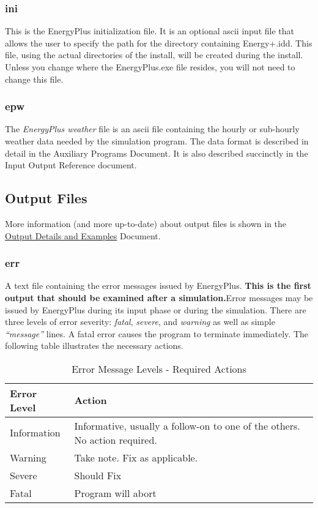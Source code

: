 \subsubsection{ini}\label{ini}

This is the EnergyPlus initialization file. It is an optional ascii input file that allows the user to specify the path for the directory containing Energy+.idd. This file, using the actual directories of the install, will be created during the install. Unless you change where the EnergyPlus.exe file resides, you will not need to change this file.

\subsubsection{epw}\label{epw}

The \emph{EnergyPlus weather} file is an ascii file containing the hourly or sub-hourly weather data needed by the simulation program. The data format is described in detail in the Auxiliary Programs Document. It is also described succinctly in the Input Output Reference document.

\subsection{Output Files}\label{output-files}

More information (and more up-to-date) about output files is shown in the \href{file:///E:/Docs4PDFs/OutputDetailsAndExamples.pdf}{Output Details and Examples} Document.

\subsubsection{err}\label{err}

A text file containing the error messages issued by EnergyPlus. \textbf{This is the first output that should be examined after a simulation.}Error messages may be issued by EnergyPlus during its input phase or during the simulation. There are three levels of error severity: \emph{fatal}, \emph{severe}, and \emph{warning} as well as simple \emph{``message''} lines. A fatal error causes the program to terminate immediately. The following table illustrates the necessary actions.

\begin{longtable}[c]{p{1.5in}p{4.5in}}
\caption{Error Message Levels - Required Actions \protect \label{table:error-message-levels-required-actions}}\\
\toprule 
Error Level & Action \tabularnewline \midrule
\endhead
Information & Informative, usually a follow-on to one of the others. No action required. \tabularnewline
Warning & Take note. Fix as applicable. \tabularnewline
Severe & Should Fix \tabularnewline
Fatal & Program will abort \tabularnewline
\bottomrule
\end{longtable}

